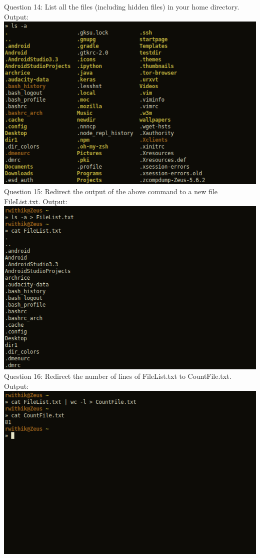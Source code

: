 \documentclass[10pt,a4paper,titlepage]{report}
\begin{document}
\newline
Question 14: List all the files (including hidden files) in your home directory.\newline
Output:\newline
\includegraphics[scale=.5]{../Images/Cycle2/14.png}\pagebreak
\newline
Question 15: Redirect the output of the above command to a new file FileList.txt.\newline
Output:\newline
\includegraphics[scale=.5]{../Images/Cycle2/15.png}\newline
\newline
Question 16: Redirect the number of lines of FileList.txt to CountFile.txt.\newline
Output:\newline
\includegraphics[scale=.5]{../Images/Cycle2/16.png}\pagebreak
\end{document}
